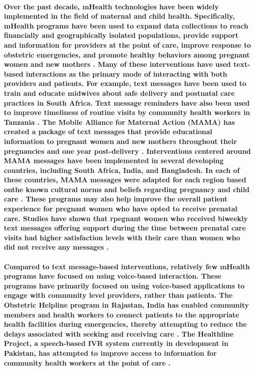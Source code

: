 \paragraph{Over the past decade, mHealth technologies have been widely implemented in the field of maternal and child health. Specifically, mHealth programs have been used to expand data collections to reach financially and geographically isolated populations, provide support and information for providers at the point of care, improve response to obstetric emergencies, and promote healthy behaviors among pregnant women and new mothers \citep{Tamrat2012}. Many of these interventions have used text-based interactions as the primary mode of interacting with both providers and patients. For example, text messages have been used to train and educate midwives about safe delivery and postnatal care practices in South Africa\citep{Woods2012}. Text message reminders have also been used to improve timeliness of routine visits by community health workers in Tanzania \citep{DeRenzi2012}. The Mobile Alliance for Maternal Action (MAMA) has created a package of text messages that provide educational information to pregnant women and new mothers throughout their pregnancies and one year post-delivery \citep{MAMA}. Interventions centered around MAMA messages have been implemented in several developing countries, including South Africa, India, and Bangladesh. In each of these countries, MAMA messages were adapted for each region based onthe known cultural norms and beliefs regarding pregnancy and child care \citep{McCartney2012}. These programs may also help improve the overall patient experience for pregnant women who have opted to receive prenatal care. Studies have shown that rpegnant women who received biweekly text messages offering support during the time between prenatal care visits had higher satisfaction levels with their care than women who did not receive any messages \citep{Jareethum2008}.}

\paragraph{Compared to text message-based interventions, relatively few mHealth programs have focused on using voice-based interaction. These programs have primarily focused on using voice-based applications to engage with community level providers, rather than patients. The Obstetric Helpline program in Rajastan, India has enabled community members and health workers to connect patients to the appropriate health facilities during emergencies, thereby attempting to reduce the delays associated with seeking and receiving care \citep{UNICEF2008}.  The Healthline Project, a speech-based IVR system currently in development in Pakistan, has attempted to improve access to information for community health workers at the point of care \citep{Sherwani2007}.}

